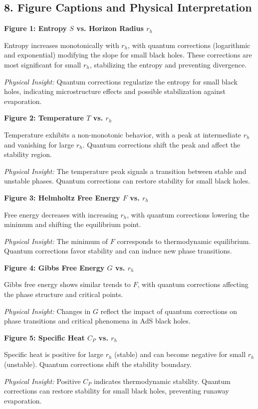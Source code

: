 \documentclass[12pt]{article}
\begin{document}
\subsection*{8. Figure Captions and Physical Interpretation}
\textbf{Figure 1: Entropy $S$ vs. Horizon Radius $r_h$}

Entropy increases monotonically with $r_h$, with quantum corrections (logarithmic and exponential) modifying the slope for small black holes. These corrections are most significant for small $r_h$, stabilizing the entropy and preventing divergence.

\textit{Physical Insight:} Quantum corrections regularize the entropy for small black holes, indicating microstructure effects and possible stabilization against evaporation.

\textbf{Figure 2: Temperature $T$ vs. $r_h$}

Temperature exhibits a non-monotonic behavior, with a peak at intermediate $r_h$ and vanishing for large $r_h$. Quantum corrections shift the peak and affect the stability region.

\textit{Physical Insight:} The temperature peak signals a transition between stable and unstable phases. Quantum corrections can restore stability for small black holes.

\textbf{Figure 3: Helmholtz Free Energy $F$ vs. $r_h$}

Free energy decreases with increasing $r_h$, with quantum corrections lowering the minimum and shifting the equilibrium point.

\textit{Physical Insight:} The minimum of $F$ corresponds to thermodynamic equilibrium. Quantum corrections favor stability and can induce new phase transitions.

\textbf{Figure 4: Gibbs Free Energy $G$ vs. $r_h$}

Gibbs free energy shows similar trends to $F$, with quantum corrections affecting the phase structure and critical points.

\textit{Physical Insight:} Changes in $G$ reflect the impact of quantum corrections on phase transitions and critical phenomena in AdS black holes.

\textbf{Figure 5: Specific Heat $C_P$ vs. $r_h$}

Specific heat is positive for large $r_h$ (stable) and can become negative for small $r_h$ (unstable). Quantum corrections shift the stability boundary.

\textit{Physical Insight:} Positive $C_P$ indicates thermodynamic stability. Quantum corrections can restore stability for small black holes, preventing runaway evaporation.
\end{document}
